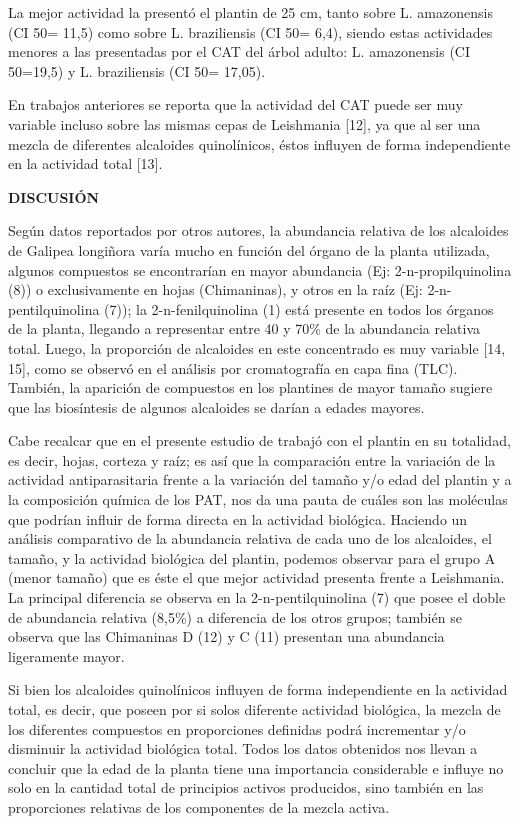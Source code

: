 \documentclass{article}
\begin{document}
La mejor actividad la presentó el plantin de 25 cm, tanto sobre L. amazonensis
(CI 50= 11,5) como sobre L. braziliensis (CI 50= 6,4), siendo estas actividades
menores a las presentadas por el CAT del árbol adulto: L. amazonensis (CI
50=19,5) y L. braziliensis (CI 50= 17,05).

En trabajos anteriores se reporta que la actividad del CAT puede ser muy
variable incluso sobre las mismas cepas de Leishmania [12], ya que al ser una
mezcla de diferentes alcaloides quinolínicos, éstos influyen de forma
independiente en la actividad total [13].

\textbf{DISCUSIÓN}

Según datos reportados por otros autores, la abundancia relativa de los
alcaloides de Galipea longiñora varía mucho en función del órgano de la planta
utilizada, algunos compuestos se encontrarían en mayor abundancia (Ej:
2-n-propilquinolina (8)) o exclusivamente en hojas (Chimaninas), y otros en la
raíz (Ej: 2-n-pentilquinolina (7)); la 2-n-fenilquinolina (1) está presente en
todos los órganos de la planta, llegando a representar entre 40 y 70\% de la
abundancia relativa total. Luego, la proporción de alcaloides en este
concentrado es muy variable [14, 15], como se observó en el análisis por
cromatografía en capa fina (TLC). También, la aparición de compuestos en los
plantines de mayor tamaño sugiere que las biosíntesis de algunos alcaloides se
darían a edades mayores.

Cabe recalcar que en el presente estudio de trabajó con el plantin en su
totalidad, es decir, hojas, corteza y raíz; es así que la comparación entre la
variación de la actividad antiparasitaria frente a la variación del tamaño y/o
edad del plantin y a la composición química de los PAT, nos da una pauta de
cuáles son las moléculas que podrían influir de forma directa en la actividad
biológica. Haciendo un análisis comparativo de la abundancia relativa de cada
uno de los alcaloides, el tamaño, y la actividad biológica del plantin, podemos
observar para el grupo A (menor tamaño) que es éste el que mejor actividad
presenta frente a Leishmania. La principal diferencia se observa en la
2-n-pentilquinolina (7) que posee el doble de abundancia relativa (8,5\%) a
diferencia de los otros grupos; también se observa que las Chimaninas D (12) y C
(11) presentan una abundancia ligeramente mayor.

Si bien los alcaloides quinolínicos influyen de forma independiente en la
actividad total, es decir, que poseen por si solos diferente actividad
biológica, la mezcla de los diferentes compuestos en proporciones definidas
podrá incrementar y/o disminuir la actividad biológica total. Todos los datos
obtenidos nos llevan a concluir que la edad de la planta tiene una importancia
considerable e influye no solo en la cantidad total de principios activos
producidos, sino también en las proporciones relativas de los componentes de la
mezcla activa.
\end{document}
